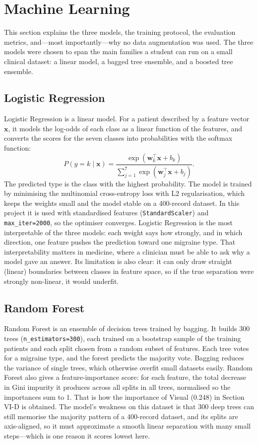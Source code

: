 \documentclass[conference]{IEEEtran}
\begin{document}
\section{Machine Learning}
This section explains the three models, the training protocol, the evaluation metrics, and---most importantly---why no data augmentation was used. The three models were chosen to span the main families a student can run on a small clinical dataset: a linear model, a bagged tree ensemble, and a boosted tree ensemble.

\subsection{Logistic Regression}
Logistic Regression is a linear model. For a patient described by a feature vector $\mathbf{x}$, it models the log-odds of each class as a linear function of the features, and converts the scores for the seven classes into probabilities with the softmax function:
\begin{equation}
P(y = k \mid \mathbf{x}) = \frac{\exp(\mathbf{w}_k^\top \mathbf{x} + b_k)}{\sum_{j=1}^{7} \exp(\mathbf{w}_j^\top \mathbf{x} + b_j)}.
\end{equation}
The predicted type is the class with the highest probability. The model is trained by minimising the multinomial cross-entropy loss with L2 regularisation, which keeps the weights small and the model stable on a 400-record dataset. In this project it is used with standardised features (\texttt{StandardScaler}) and \texttt{max\_iter=2000}, so the optimiser converges. Logistic Regression is the most interpretable of the three models: each weight says how strongly, and in which direction, one feature pushes the prediction toward one migraine type. That interpretability matters in medicine, where a clinician must be able to ask why a model gave an answer. Its limitation is also clear: it can only draw straight (linear) boundaries between classes in feature space, so if the true separation were strongly non-linear, it would underfit.

\subsection{Random Forest}
Random Forest is an ensemble of decision trees trained by bagging. It builds 300 trees (\texttt{n\_estimators=300}), each trained on a bootstrap sample of the training patients and each split chosen from a random subset of features. Each tree votes for a migraine type, and the forest predicts the majority vote. Bagging reduces the variance of single trees, which otherwise overfit small datasets easily. Random Forest also gives a feature-importance score: for each feature, the total decrease in Gini impurity it produces across all splits in all trees, normalised so the importances sum to 1. That is how the importance of Visual (0.248) in Section VI-D is obtained. The model's weakness on this dataset is that 300 deep trees can still memorise the majority pattern of a 400-record dataset, and its splits are axis-aligned, so it must approximate a smooth linear separation with many small steps---which is one reason it scores lowest here.
\end{document}
